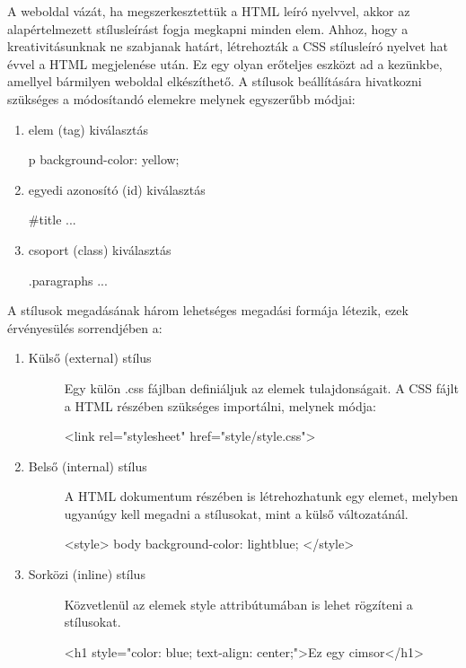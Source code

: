 A weboldal vázát, ha megszerkesztettük a HTML leíró nyelvvel, akkor az alapértelmezett stílusleírást fogja megkapni minden elem. Ahhoz, hogy a kreativitásunknak ne szabjanak határt, létrehozták a CSS stílusleíró nyelvet hat évvel a HTML megjelenése után. Ez egy olyan erőteljes eszközt ad a kezünkbe, amellyel bármilyen weboldal elkészíthető. A stílusok beállítására hivatkozni szükséges a módosítandó elemekre melynek egyszerűbb módjai:
\begin{enumerate}
  \item elem (tag) kiválasztás \begin{HTML5}
p {
    background-color: yellow;
}
\end{HTML5}
  \item egyedi azonosító (id) kiválasztás \begin{HTML5}
#title { ... }
\end{HTML5}
  \item csoport (class) kiválasztás \begin{HTML5}
.paragraphs { ... }
\end{HTML5}
\end{enumerate}
A stílusok megadásának három lehetséges megadási formája létezik, ezek érvényesülés sorrendjében a:
\begin{enumerate}
  \item Külső (external) stílus \begin{description}
  \item[] Egy külön .css fájlban definiáljuk az elemek tulajdonságait. A CSS fájlt a HTML  részében szükséges importálni, melynek módja: \begin{HTML5}
<link rel="stylesheet" href="style/style.css">
\end{HTML5}
\end{description}

  \item Belső (internal) stílus \begin{description}
  \item[] A HTML dokumentum  részében is létrehozhatunk egy  elemet, melyben ugyanúgy kell megadni a stílusokat, mint a külső változatánál. \begin{HTML5}
<style>
body{
    background-color: lightblue;
}
</style>
\end{HTML5}
\end{description}
  \item Sorközi (inline) stílus \begin{description}
  \item[] Közvetlenül az elemek style attribútumában is lehet rögzíteni a stílusokat. \begin{HTML5}
<h1 style="color: blue; text-align: center;">Ez egy cimsor</h1>
\end{HTML5}
\end{description}
\end{enumerate}

